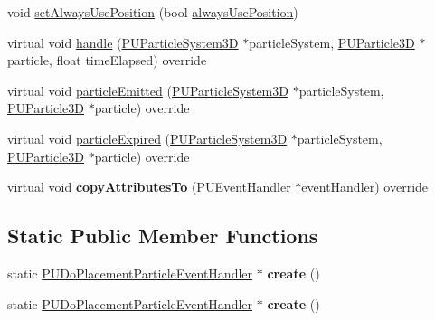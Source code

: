 \begin{DoxyCompactItemize}
\item 
void \hyperlink{classPUDoPlacementParticleEventHandler_a51a2f5293ed320aff56a71749e9d83a0}{set\+Always\+Use\+Position} (bool \hyperlink{classPUDoPlacementParticleEventHandler_a95a5ae60fc370645d6aae741235f03f0}{always\+Use\+Position})
\item 
virtual void \hyperlink{classPUDoPlacementParticleEventHandler_a12d37fe5d03f1b25b5ba62020d792b3b}{handle} (\hyperlink{classPUParticleSystem3D}{P\+U\+Particle\+System3D} $\ast$particle\+System, \hyperlink{structPUParticle3D}{P\+U\+Particle3D} $\ast$particle, float time\+Elapsed) override
\item 
virtual void \hyperlink{classPUDoPlacementParticleEventHandler_a7a287666100cc49f771f77bdde488292}{particle\+Emitted} (\hyperlink{classPUParticleSystem3D}{P\+U\+Particle\+System3D} $\ast$particle\+System, \hyperlink{structPUParticle3D}{P\+U\+Particle3D} $\ast$particle) override
\item 
virtual void \hyperlink{classPUDoPlacementParticleEventHandler_a4b6fac6b01871783eff57086e875b531}{particle\+Expired} (\hyperlink{classPUParticleSystem3D}{P\+U\+Particle\+System3D} $\ast$particle\+System, \hyperlink{structPUParticle3D}{P\+U\+Particle3D} $\ast$particle) override
\item 
\mbox{\label{classPUDoPlacementParticleEventHandler_a4f17f0eb897d716a98de89662619b082}} 
virtual void {\bfseries copy\+Attributes\+To} (\hyperlink{classPUEventHandler}{P\+U\+Event\+Handler} $\ast$event\+Handler) override
\end{DoxyCompactItemize}
\subsection*{Static Public Member Functions}
\begin{DoxyCompactItemize}
\item 
\mbox{\label{classPUDoPlacementParticleEventHandler_af352f8b5b10ff502eb2f696838f5cd74}} 
static \hyperlink{classPUDoPlacementParticleEventHandler}{P\+U\+Do\+Placement\+Particle\+Event\+Handler} $\ast$ {\bfseries create} ()
\item 
\mbox{\label{classPUDoPlacementParticleEventHandler_a16d314fcf9c32faa40b2f5c05d06bce5}} 
static \hyperlink{classPUDoPlacementParticleEventHandler}{P\+U\+Do\+Placement\+Particle\+Event\+Handler} $\ast$ {\bfseries create} ()
\end{DoxyCompactItemize}

